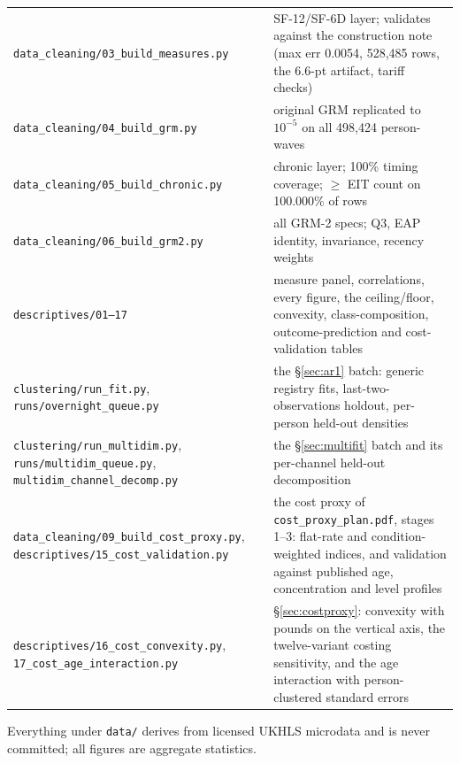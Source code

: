 \documentclass[11pt]{article}
\newcommand{\code}[1]{\texttt{\small #1}}
\begin{document}
\begin{center}\small
\begin{tabular}{@{}>{\raggedright\arraybackslash}p{6.1cm}>{\raggedright\arraybackslash}p{8.0cm}@{}}
\toprule
\code{data\_cleaning/03\_build\_measures.py} & SF-12/SF-6D layer; validates
against the construction note (max err 0.0054, 528{,}485 rows, the 6.6-pt
artifact, tariff checks) \\
\code{data\_cleaning/04\_build\_grm.py} & original GRM replicated to
$10^{-5}$ on all 498{,}424 person-waves \\
\code{data\_cleaning/05\_build\_chronic.py} & chronic layer; 100\% timing
coverage; $\ge$ EIT count on 100.000\% of rows \\
\code{data\_cleaning/06\_build\_grm2.py} & all GRM-2 specs; Q3, EAP
identity, invariance, recency weights \\
\code{descriptives/01--17} & measure panel, correlations, every figure, the
ceiling/floor, convexity, class-composition, outcome-prediction and
cost-validation tables \\
\code{clustering/run\_fit.py}, \code{runs/overnight\_queue.py} & the
\S\ref{sec:ar1} batch: generic registry fits, last-two-observations holdout,
per-person held-out densities \\
\code{clustering/run\_multidim.py}, \code{runs/multidim\_queue.py},
\code{multidim\_channel\_decomp.py} & the \S\ref{sec:multifit} batch and its
per-channel held-out decomposition \\
\code{data\_cleaning/09\_build\_cost\_proxy.py},
\code{descriptives/15\_cost\_validation.py} & the cost proxy of
\code{cost\_proxy\_plan.pdf}, stages 1--3: flat-rate and condition-weighted
indices, and validation against published age, concentration and level
profiles \\
\code{descriptives/16\_cost\_convexity.py},
\code{17\_cost\_age\_interaction.py} & \S\ref{sec:costproxy}: convexity with
pounds on the vertical axis, the twelve-variant costing sensitivity, and the
age interaction with person-clustered standard errors \\
\bottomrule
\end{tabular}
\end{center}

Everything under \code{data/} derives from licensed UKHLS microdata and is
never committed; all figures are aggregate statistics.
\end{document}
